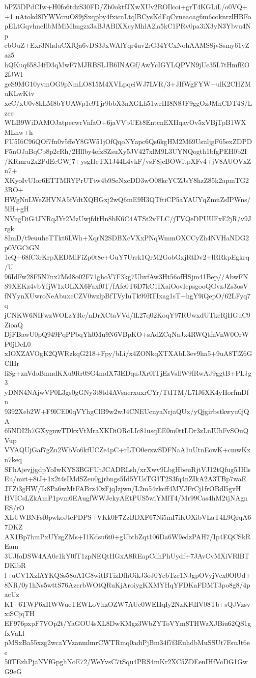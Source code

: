 bPZ5DPdCIw+H0fo6tdzS30FD/Zb0oktfJXwXUv2ROIlcoi+grT4KGLiL/o0VQ++1
uAtokd8lYWVcruO89jSxqpby4fxicnLtqlBCysKdFqCvneaoag6m6coknrzlHBFo
pELtGqvhncIlbMMiMlmgzx3aBJABlXXcyMhlA2la5kC1PRv0pa3iX3yN3Ybvu4Np
ebOuZ+Exr3NhduCXfQa6vDS3JxWAlYqr4uv2rG34YCxNohAAMS8jvSsmy61yZaz5
hQKuq658J4fD3qMwF7MJRBSLJB6INAGf/AwYcIGYLQPVN9jUc35L7tHmfEO2fJWI
geS9MG10yvmOG9pNmLO815M4XVLpqeiWJ7LVR/3+JIfWgFYW+ulK2CHZMuKLwKtv
xcC/xU0v8kLM8bYUAWp1e9Tjr9bbX3nXGLh51wrIH8N8JF9ggOzJMnCDT4S/Lzee
WLB9WiDAMOJatpecwrVafaO+6jaVVbUEt8EntcnEXHqayOv5xVBjTpB1WXMLnw+h
FU5I6C96QOf7fn0v5ffeY8GW51jOfQqoNYapc6Qs6kgHM2M69UsnljgF65exZDPD
F5nOJaBqCb8p2cRh/2Hllby4efzSZsuXy5JV427xlM9L3UYNQogth1bfgPEH0b2I
/KRmru2x2PdEeGWj7+ysgHcTX1J44L4vkF/vsF8jcBOWitpXFv4+jV8AUOVxZn7+
XKyoIvUIor6ETTMRYPrUTtw4b9SeNxcDD3wO08kcYCZJsY8hzZ85k2apmTG23RO+
HWgNnLWeZHVNA5fVdtXQHGxj2wQ6mE9H3QTftiCP5aYAUYqZmuZsIPWns/5lH+gH
NVugDiG4JNRqJYr2MzUwjfdtHn8bK6C4ATSt2vFLC/jTVQeDPUUFxE2jR/v9Jrgk
8ImD/t9euuheTTkt6LWh+XqrN2SDBXcVXxPNqWmmOXCCyZh4NVHaNDG2p0VGCiGN
1eQ+68fC3rKrpXEDMlFiZp0t8e+GuY7Urrk1QrM2GobGxjRtDv2+lRRkpEgkrq/U
96IdFw28F5N7nx7Msl8o02F71ghoV7F3kg7UbxfAw3Ht56ofHSjm41Bep//AbwFN
S9XEKz4vbYfjW1xOLXX6Faxf0T/fAfc0T6D7kC1IXaiOovIepsgooQGvzJZs3osV
fNYynXUwroNeAbuxcCZV0wzlpBfTVyIuTk99RTIxag1sT+hgY9iQepO/62LFyq7q
jCNKW6NIFwzWOLzYRc/nDrXCtaVVd/lL27q02KoqY97RUwxdUTkcRjHGuC9ZioaQ
DjFBawU0pQ949PqPPbqYh0Mu9N6VBpKO+sAdZCqNaJx4RWQtfnVnW0OrWP0jDcL0
xIOXZAVOgK2QWRzkqG218+Fpy/bLi/x4ZONkqXTXAbL3ev9ha5+9uA8TlZ6GClHr
liSg+znVdoBmndKXu9Rr0SG4mdX73EDquJXr0ITjEzVsllW9fRwAJ9ggtB+PLJg3
yDNN4NAjwVP0L3gs0gGNy3t8td4AVsaerxuxrCYr/TtITM/L7IJ6XK4yHorfmDfn
9392Xeb2W+F9lCE00qVYhgClB9w2wJ4CNEUcnyaNrjaQUx/yQjgirbstkwyu0jQA
65NDI2h7GXygnwTDkxVtMraXKDiORcLIc81usqEE0m0ttLDr3zLnIUhFvSOuQVup
VYAQUjGaf7gZn2WbVo6kfUCZe4pC+rLTO0erzwSDFNaA1uUtnEowK+cmwKxn7keq
SFhAjevjjgdpYoIwKYS3BGFUtJCADRLsh/xrXwv9LbgHbeuRjtVJ12tQfug5JHls
Eu/mzt+8iJ+1x2t4sIMdSZeu0gjrbngs5Id5YUsTG1T2S3fq4nZIkA2A3TBp7waE
JFZi3gHW/lk8Pa6wMtFABrz40zFjqIzjwn/L2m54zkcff4MYJFrCj1frOBdl5gvH
HVICsLZkAmP1pvm6EAugfWWJekyAEtPUS5wiYMlT4/Mr99Cas4hM2tjNAgnES/rO
XLUWBNFsf0pwkoJtePDPS+VKk0F7ZzBDXF67Ni5mI7iKOXibVLaT4L9QrqA67DKZ
AX1Bp7hmPxUYzgZMs+I1Kdsu6t0+gUbtbZqt106Da6W9edzPAH7/Ip4EQCSkREam
3UJfoDSW4AA0c1kY0fT1zpNEQtHGxA8REapCdhPhUydf+7JAvCvMXiVRlBTDKibR
l+uCV1XzlAYKQSs58oA1G8witBTizDfhOikJ3oJ0YcbTzc1NJgpOVyjVcx0OlUd+
8NR/0y1hNs5wttS76AzcrbWOtQRuKjAroiygKXMYHqYFDKaFDMT3po8g8/4pacUz
K1+6TWP6xHWWueTEWLoVhzOZW7AUc0WEHqIy2NzKFdIV08Tb+sQJVzsvxiSCjqTH
EF976pxpF7VOp2t/YaGOU4sXL8DwKMgz3WbZYToVYm8THWzXJBiu62QS1gfxVaLl
pMSxBa55xzg2wcaYVzanmlmrCWTRmq0adiPjBm34f7f3EuhdbMuSSUt7FsuJt6ee
50TEzhPjaNVfGpghNoE72/WeYvsC7tSqu4PRS4mKr2XC5ZDEenIHfVoDG1GwG9eG
